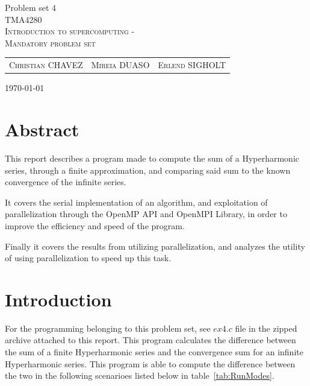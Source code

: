 \documentclass[fontsize=11pt,paper=a4,titlepage]{report}
\begin{document}
\begin{center}


{\huge Problem set 4}\\[0.5cm]

\textsc{\LARGE TMA4280}\\[0.5cm]
\textsc{\large Introduction to supercomputing -}\\
\textsc{\large Mandatory problem set}\\[0.6cm]

\begin{table}[h]
\centering
\begin{tabular}{ccc}
	\textsc{Christian CHAVEZ}	&	\textsc{Mireia DUASO}	&	\textsc{Erlend SIGHOLT}
\end{tabular}
\end{table}

\large{\today}
\vfill
\section*{Abstract}
\end{center}

This report describes a program made to compute the sum of a Hyperharmonic series, through a finite approximation, and comparing said sum to the known convergence of the infinite series.

It covers the serial implementation of an algorithm, and exploitation of parallelization through the OpenMP API and OpenMPI Library, in order to improve the efficiency and speed of the program.

Finally it covers the results from utilizing parallelization, and analyzes the utility of using parallelization to speed up this task.

\addtocounter{chapter}{1}

\clearpage
\section{Introduction}

For the programming belonging to this problem set, see $\textit{ex4.c}$ file in
the zipped archive attached to this report. This program calculates the
difference between the sum of a finite Hyperharmonic series and the convergence
sum for an infinite Hyperharmonic series. This program is able to compute the
difference between the two in the following scenarioes listed below in
table~\ref{tab:RunModes}.
\end{document}
